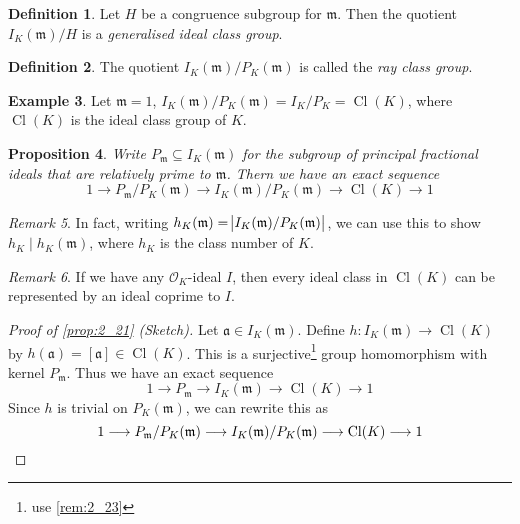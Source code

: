 \documentclass[11pt]{article}
\theoremstyle{definition}
\newtheorem{definition}{Definition}[section]
\newtheorem{example}[definition]{Example}
\theoremstyle{plain}
\newtheorem{proposition}[definition]{Proposition}
\theoremstyle{remark}
\newtheorem{remark}[definition]{Remark}
\DeclareMathOperator{\Cl}{Cl}
\newcommand{\cO}{\mathcal{O}}
\newcommand{\fa}{\mathfrak{a}}
\newcommand{\fm}{\mathfrak{m}}
\begin{document}
\begin{definition}\label{def:2_18}
    Let $H$ be a congruence subgroup for $\fm$. Then the quotient $I_K(\fm)/H$ is a \emph{generalised ideal class group}.
\end{definition}

\begin{definition}\label{def:2_19}
    The quotient $I_K(\fm)/P_K(\fm)$ is called the \emph{ray class group}.
\end{definition}

\begin{example}\label{eg:2_20}
    Let $\fm = 1$, $I_K(\fm)/P_K(\fm) = I_K/P_K = \Cl(K)$, where $\Cl(K)$ is the ideal class group of $K$.
\end{example}

\begin{proposition}\label{prop:2_21}
    Write $P_\fm \subseteq I_K(\fm)$ for the subgroup of principal fractional ideals that are relatively prime to $\fm$. Thern we have an exact sequence
    \begin{equation*}
        1 \longrightarrow P_\fm/P_K(\fm) \longrightarrow I_K(\fm)/P_K(\fm) \longrightarrow \Cl(K) \longrightarrow 1
    \end{equation*}
\end{proposition}

\begin{remark}\label{rem:2_22}
    In fact, writing $h_K(\fm) = \abs{I_K(\fm)/P_K(\fm)}$, we can use this to show $h_K \mid h_K(\fm)$, where $h_K$ is the class number of $K$.
\end{remark}

\begin{remark}\label{rem:2_23}
    If we have any $\cO_K$-ideal $I$, then every ideal class in $\Cl(K)$ can be represented by an ideal coprime to $I$.
\end{remark}

\begin{proof}[Proof of \autoref{prop:2_21} (Sketch)]
    Let $\fa \in I_K(\fm)$. Define $h : I_K(\fm) \to \Cl(K)$ by $h(\fa) = [\fa] \in \Cl(K)$. This is a surjective\footnote{use \autoref{rem:2_23}} group homomorphism with kernel $P_\fm$. Thus we have an exact sequence
    \begin{equation*}
        1 \longrightarrow P_\fm \longrightarrow I_K(\fm) \longrightarrow \Cl(K) \longrightarrow 1
    \end{equation*}
    Since $h$ is trivial on $P_K(\fm)$, we can rewrite this as
    \begin{equation*}
        1 \longrightarrow P_\fm/P_K(\fm) \longrightarrow I_K(\fm)/P_K(\fm) \longrightarrow \Cl(K) \longrightarrow 1 \qedhere
    \end{equation*}
\end{proof}
\end{document}
